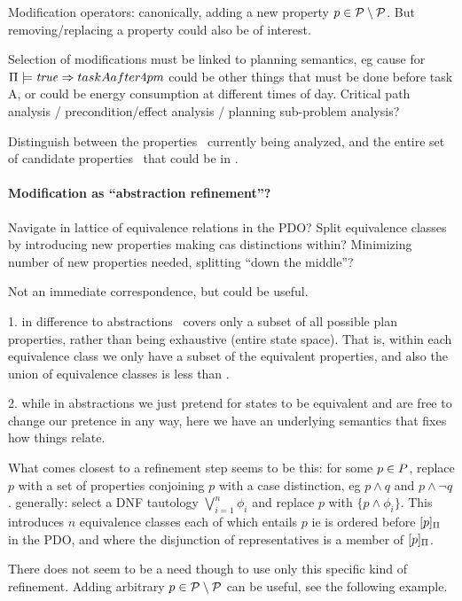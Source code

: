 Modification operators: canonically, adding a new property $p \in
\cal P \setminus P$. But removing/replacing a property could
also be of interest.

Selection of modifications must be linked to planning semantics, eg
cause for $\Pi \models \mathit{true} \Rightarrow taskAafter4pm$ could be other
things that must be done before task A, or could be energy consumption
at different times of day. Critical path analysis /
precondition/effect analysis / planning sub-problem analysis?


Distinguish between the properties \props\ currently being analyzed,
and the entire set of candidate properties \candprops\ that could be
in \props.


\paragraph{Modification as ``abstraction refinement''?}

Navigate in lattice of equivalence relations in the PDO? Split
equivalence classes by introducing new properties making cas
distinctions within? Minimizing number of new properties needed,
splitting ``down the middle''? 

Not an immediate correspondence, but could be useful.

1. in difference to abstractions \props\ covers only a subset of all
possible plan properties, rather than being exhaustive (entire state
space). That is, within each equivalence class we only have a subset
of the equivalent properties, and also the union of equivalence
classes is less than \candprops.

2. while in abstractions we just pretend for states to be equivalent
and are free to change our pretence in any way, here we have an
underlying semantics that fixes how things relate.

What comes closest to a refinement step seems to be this: for some $p
\in P$, replace $p$ with a set of properties conjoining $p$ with
a case distinction, eg $p \wedge q$ and $p \wedge \neg q$. generally:
select a DNF tautology $\bigvee_{i=1}^n \phi_i$ and replace $p$ with
$\{p \wedge \phi_i\}$. This introduces $n$ equivalence classes each of
which entails $p$ ie is ordered before $[p]_{\Pi}$ in the
PDO, and where the disjunction of representatives is a member of
$[p]_{\Pi}$.

There does not seem to be a need though to use only this specific kind
of refinement. Adding arbitrary $p \in \cal P \setminus P$
can be useful, see the following example.





